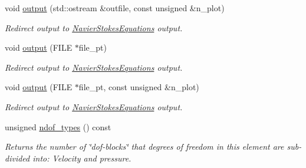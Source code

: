 \begin{DoxyCompactItemize}
void \hyperlink{classoomph_1_1LinearisedQTaylorHoodElement_a323f84cf9d6e3fc85e96e6e0a0f23ada}{output} (std\+::ostream \&outfile, const unsigned \&n\+\_\+plot)
\begin{DoxyCompactList}\small\item\em Redirect output to \hyperlink{classoomph_1_1NavierStokesEquations}{Navier\+Stokes\+Equations} output. \end{DoxyCompactList}\item 
void \hyperlink{classoomph_1_1LinearisedQTaylorHoodElement_a93a43aa55672d50f4fde9b0f088c95ab}{output} (F\+I\+LE $\ast$file\+\_\+pt)
\begin{DoxyCompactList}\small\item\em Redirect output to \hyperlink{classoomph_1_1NavierStokesEquations}{Navier\+Stokes\+Equations} output. \end{DoxyCompactList}\item 
void \hyperlink{classoomph_1_1LinearisedQTaylorHoodElement_a2725e5c308afb58f54dfb16aef114a31}{output} (F\+I\+LE $\ast$file\+\_\+pt, const unsigned \&n\+\_\+plot)
\begin{DoxyCompactList}\small\item\em Redirect output to \hyperlink{classoomph_1_1NavierStokesEquations}{Navier\+Stokes\+Equations} output. \end{DoxyCompactList}\item 
unsigned \hyperlink{classoomph_1_1LinearisedQTaylorHoodElement_a2cd2df4e56d4bd418e63ce1d15336082}{ndof\+\_\+types} () const
\begin{DoxyCompactList}\small\item\em Returns the number of \char`\"{}dof-\/blocks\char`\"{} that degrees of freedom in this element are sub-\/divided into\+: Velocity and pressure. \end{DoxyCompactList}\end{DoxyCompactItemize}
